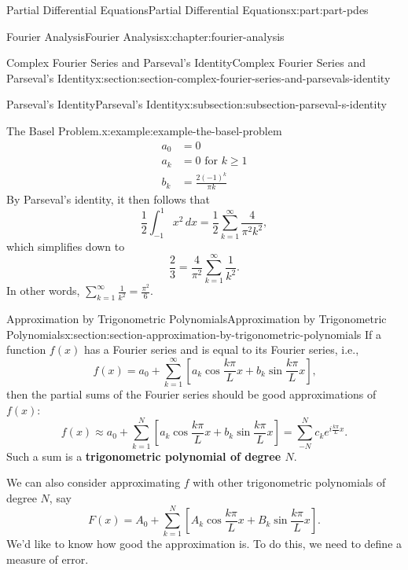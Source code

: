 \documentclass[oneside,10pt,]{book}
\newcommand{\terminology}[1]{\textbf{#1}}
\numberwithin{equation}{part}
\newcommand{\amp}{&}
\begin{document}
\begin{partptx}{Partial Differential Equations}{}{Partial Differential Equations}{}{}{x:part:part-pdes}
\begin{chapterptx}{Fourier Analysis}{}{Fourier Analysis}{}{}{x:chapter:fourier-analysis}
\begin{sectionptx}{Complex Fourier Series and Parseval's Identity}{}{Complex Fourier Series and Parseval's Identity}{}{}{x:section:section-complex-fourier-series-and-parsevals-identity}
\begin{subsectionptx}{Parseval's Identity}{}{Parseval's Identity}{}{}{x:subsection:subsection-parseval-s-identity}
\begin{example}{The Basel Problem.}{x:example:example-the-basel-problem}
\begin{align*}
a_{0} \amp = 0 \\
a_{k} \amp = 0 \text{ for } k\geq 1 \\
b_{k} \amp = \frac{2(-1)^{k}}{\pi k} 
\end{align*}
By Parseval's identity, it then follows that%
\begin{equation*}
\frac{1}{2}\int_{-1}^{1}x^{2}\,dx = \frac{1}{2}\sum_{k=1}^{\infty}\frac{4}{\pi^{2}k^{2}},
\end{equation*}
which simplifies down to%
\begin{equation*}
\frac{2}{3} = \frac{4}{\pi^{2}}\sum_{k=1}^{\infty}\frac{1}{k^{2}}.
\end{equation*}
In other words, \(\sum_{k=1}^{\infty}\frac{1}{k^{2}} = \frac{\pi^{2}}{6}.\)%
\end{example}
%
\end{subsectionptx}
\end{sectionptx}
%
%
\typeout{************************************************}
\typeout{************************************************}
%
\begin{sectionptx}{Approximation by Trigonometric Polynomials}{}{Approximation by Trigonometric Polynomials}{}{}{x:section:section-approximation-by-trigonometric-polynomials}
If a function \(f(x)\) has a Fourier series and is equal to its Fourier series, i.e.,%
\begin{equation*}
f(x) = a_{0} + \sum_{k=1}^{\infty}[a_{k}\cos\frac{k\pi}{L}x + b_{k}\sin\frac{k\pi}{L}x]\text{,}
\end{equation*}
then the partial sums of the Fourier series should be good approximations of \(f(x)\):%
\begin{equation*}
f(x) \approx a_{0} + \sum_{k=1}^{N}[a_{k}\cos\frac{k\pi}{L}x + b_{k}\sin\frac{k\pi}{L}x] = \sum_{-N}^{N}c_{k}e^{i\frac{k\pi}{L}x}\text{.}
\end{equation*}
Such a sum is a \terminology{trigonometric polynomial of degree \(N\)}.%
\par
We can also consider approximating \(f\) with other trigonometric polynomials of degree \(N\), say%
\begin{equation*}
F(x) = A_{0} + \sum_{k=1}^{N}[A_{k}\cos\frac{k\pi}{L}x + B_{k}\sin\frac{k\pi}{L}x]\text{.}
\end{equation*}
We'd like to know how good the approximation is. To do this, we need to define a measure of error.%

\end{sectionptx}
\end{chapterptx}
\end{partptx}
\end{document}
